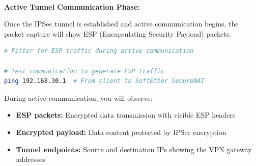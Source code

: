 \noindent
\\
\textbf{Active Tunnel Communication Phase:}

\noindent
Once the IPSec tunnel is established and active communication begins, the packet capture will show ESP (Encapsulating Security Payload) packets:

\begin{lstlisting}[language=bash]
# Filter for ESP traffic during active communication

# Test communication to generate ESP traffic
ping 192.168.30.1  # From client to SoftEther SecureNAT
\end{lstlisting}

\noindent
During active communication, you will observe:
\begin{itemize}
    \item \textbf{ESP packets:} Encrypted data transmission with visible ESP headers
    \item \textbf{Encrypted payload:} Data content protected by IPSec encryption
    \item \textbf{Tunnel endpoints:} Source and destination IPs showing the VPN gateway addresses
\end{itemize}

